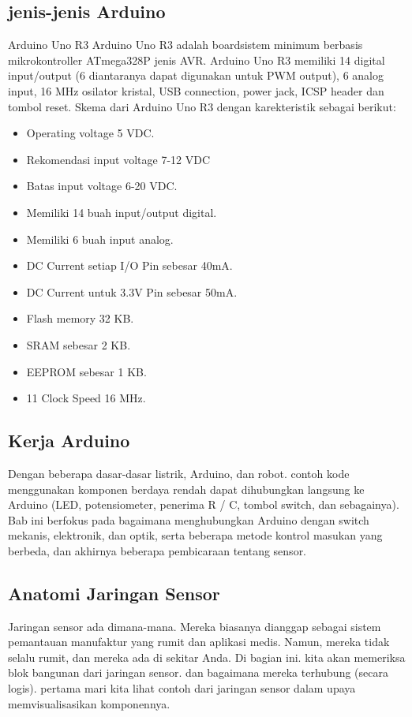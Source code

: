 \subsection{jenis-jenis Arduino}
Arduino Uno R3
Arduino Uno R3 adalah boardsistem minimum berbasis mikrokontroller ATmega328P jenis AVR. Arduino Uno R3 memiliki 14 digital input/output (6
diantaranya dapat digunakan untuk PWM output), 6 analog input, 16 MHz osilator kristal, USB connection, power jack, ICSP header dan tombol reset. Skema dari Arduino Uno R3 dengan
karekteristik sebagai berikut:
\begin{itemize}
\item Operating voltage 5 VDC.
\item Rekomendasi input voltage 7-12
VDC
\item Batas input voltage 6-20 VDC.
\item Memiliki 14 buah input/output
digital.
\item Memiliki 6 buah input analog.
\item DC Current setiap I/O Pin sebesar
40mA.
\item DC Current untuk 3.3V Pin sebesar
50mA.
\item Flash memory 32 KB.
\item SRAM sebesar 2 KB.
\item EEPROM sebesar 1 KB.
\item 11 Clock Speed 16 MHz.
\end{itemize}

\subsection{Kerja Arduino}
Dengan beberapa dasar-dasar listrik, Arduino, dan robot.
contoh kode menggunakan komponen berdaya rendah dapat dihubungkan langsung ke Arduino (LED, potensiometer, penerima R / C, tombol switch, dan sebagainya). 
Bab ini berfokus pada bagaimana menghubungkan Arduino dengan switch mekanis, elektronik, dan optik, serta beberapa metode kontrol masukan yang berbeda, dan akhirnya beberapa pembicaraan tentang sensor.

\subsection{Anatomi Jaringan Sensor}
Jaringan sensor ada dimana-mana. Mereka biasanya dianggap sebagai sistem pemantauan manufaktur yang rumit
dan aplikasi medis. Namun, mereka tidak selalu rumit, dan mereka ada di sekitar Anda.
Di bagian ini. kita akan memeriksa blok bangunan dari jaringan sensor. dan bagaimana mereka terhubung (secara logis).
pertama mari kita lihat contoh dari jaringan sensor dalam upaya memvisualisasikan komponennya.

